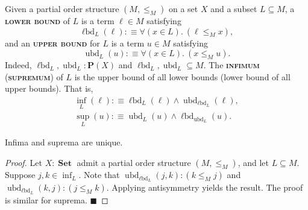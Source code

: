 \documentclass{article}
\newcommand{\defn}[1]{{\scshape\bfseries\color{MPBemph}#1}}
\renewcommand{\qed}{\hfill{\color{MPBthm}\( \blacksquare \)}}
\newcommand{\eql}{\mathbin{:\equiv}}
\newcommand{\1}{\textbf{1}}
\newcommand{\0}{\mathbf{0}}
\newcommand{\2}{\textbf{2}}
\DeclareMathOperator{\Set}{\textbf{Set}}
\renewcommand{\P}{\textbf{P}}
\DeclareMathOperator{\lbd}{{\ell}bd}
\DeclareMathOperator{\ubd}{ubd}
\begin{document}
Given a partial order structure \( (M, \leq_{M}) \) on a set \( X \) and a subset \( L \subseteq M \), a \defn{lower bound} of \( L \) is a term \( \ell \in M \) satisfying
\[ \lbd_{L}(\ell) \eql \forall(x \in L).~ (\ell \leq_{M} x), \]
and an \defn{upper bound} for \( L \) is a term \( u \in M \) satisfying
\[ \ubd_{L}(u) \eql \forall(x \in L).~ (x \leq_{M} u). \]
Indeed, \( \lbd_{L}, \ubd_{L} : \P(X) \) and \( \lbd_{L}, \ubd_{L} \subseteq M \).
The \defn{infimum} (\defn{supremum}) of \( L \) is the upper bound of all lower bounds (lower bound of all upper bounds). That is,
\[ \begin{array}{c}
	\inf_{L}(\ell) \eql \lbd_{L}(\ell) \wedge \ubd_{\lbd_{L}}(\ell), \\[3pt]
	\sup_{L}(u) \eql \ubd_{L}(u) \wedge \lbd_{\ubd_{L}}(u).
\end{array} \]
\begin{lemma}{}{} Infima and suprema are unique.
\begin{proof}
	Let \( X : \Set \) admit a partial order structure \( (M, \leq_{M}) \), and let \( L \subseteq M \). Suppose \( j, k \in \inf_{L} \). Note that \( \ubd_{\lbd_{L}}(j, k) : (k \leq_{M} j) \) and \( \ubd_{\lbd_{L}}(k, j) : (j \leq_{M} k) \). Applying antisymmetry yields the result. The proof is similar for suprema. \qed
\end{proof} \end{lemma}
\end{document}
